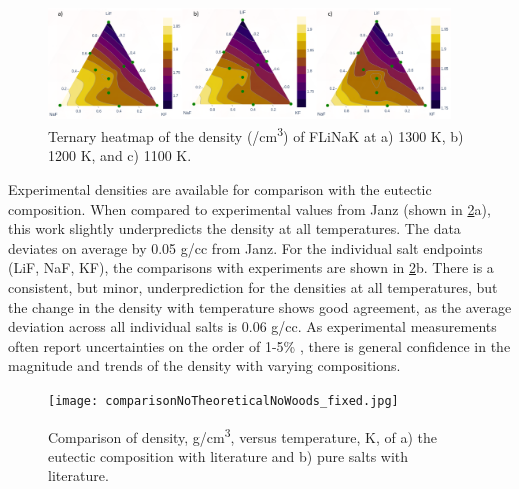 \documentclass[preprint,12pt]{elsarticle}
\begin{document}
\begin{figure}[h!]
    \centering
    \includegraphics[width=0.95\textwidth]{densityTernary_withScatter.png}
    \caption{Ternary heatmap of the density (/cm\textsuperscript{3}) of FLiNaK at a) 1300 K, b) 1200 K, and c) 1100 K.}
    \label{fig:densityHeat}
\end{figure}


Experimental densities are available for comparison with the eutectic composition. When compared to experimental values from Janz \cite{Janz1981} (shown in \cref{fig:densityCompare}a), this work slightly underpredicts the density at all temperatures. The data deviates on average by 0.05 g/cc from Janz. %
For the individual salt endpoints (LiF, NaF, KF), the comparisons with experiments are shown in \cref{fig:densityCompare}b. There is a consistent, but minor, underprediction for the densities at all temperatures, but the change in the density with temperature shows good agreement, as the average deviation across all individual salts is 0.06 g/cc. As experimental measurements often report uncertainties on the order of 1-5\% \cite{JanzSaltProp}, there is general confidence in the magnitude and trends of the density with varying compositions.

\begin{figure}[!h]
\centering
\texttt{[image: comparisonNoTheoreticalNoWoods\_fixed.jpg]}
\caption{Comparison of density, g/cm\textsuperscript{3}, versus temperature, K, of a) the eutectic composition with literature\cite{Janz1981} and b) pure salts with literature\cite{JanzSaltProp}.}
\label{fig:densityCompare}
\end{figure}
\end{document}
